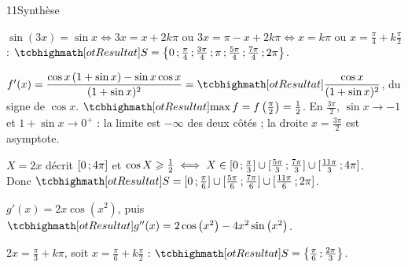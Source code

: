 \begin{corrige}{11}{Synthèse}
\begin{questions}
  \item $\sin(3x)=\sin x\iff3x=x+2k\pi$ ou $3x=\pi-x+2k\pi\iff x=k\pi$ ou $x=\frac{\pi}{4}+k\frac{\pi}{2}$ :
    $\res{S=\ens{0\pv\frac{\pi}{4}\pv\frac{3\pi}{4}\pv\pi\pv\frac{5\pi}{4}\pv\frac{7\pi}{4}\pv2\pi}}$.
\end{questions}
\noindent
\begin{minipage}[t]{0.5\linewidth}\vspace{0pt}\raggedright
\begin{questions}[start=2]
  \item $f'(x)=\dfrac{\cos x\,(1+\sin x)-\sin x\cos x}{(1+\sin x)^{2}}=\res{\dfrac{\cos x}{(1+\sin x)^{2}}}$, du signe de $\cos x$.
    $\res{\max f=f\left(\frac{\pi}{2}\right)=\frac12}$. En $\frac{3\pi}{2}$, $\sin x\to-1$ et $1+\sin x\to0^{+}$ : la limite est
    $-\infty$ des deux côtés ; la droite $x=\frac{3\pi}{2}$ est asymptote.
\end{questions}
\end{minipage}\hfill
\begin{minipage}[t]{0.46\linewidth}\vspace{1mm}
\centering
\begin{tableau}
\end{tableau}
\end{minipage}
\begin{questions}[start=3]
  \item $X=2x$ décrit $\mathopen{[}0\,{;}\,4\pi\mathclose{]}$ et $\cos X\geqslant\frac12\iff X\in\mathopen{[}0\,{;}\,\frac{\pi}{3}\mathclose{]}\cup\mathopen{[}\frac{5\pi}{3}\,{;}\,\frac{7\pi}{3}\mathclose{]}\cup\mathopen{[}\frac{11\pi}{3}\,{;}\,4\pi\mathclose{]}$.\\
    Donc $\res{S=\intFF{0}{\frac{\pi}{6}}\cup\intFF{\frac{5\pi}{6}}{\frac{7\pi}{6}}\cup\intFF{\frac{11\pi}{6}}{2\pi}}$.
  \item $g'(x)=2x\cos\left(x^{2}\right)$, puis $\res{g''(x)=2\cos\left(x^{2}\right)-4x^{2}\sin\left(x^{2}\right)}$.
  \item $2x=\frac{\pi}{3}+k\pi$, soit $x=\frac{\pi}{6}+k\frac{\pi}{2}$ : $\res{S=\ens{\frac{\pi}{6}\pv\frac{2\pi}{3}}}$.
\end{questions}
\end{corrige}

